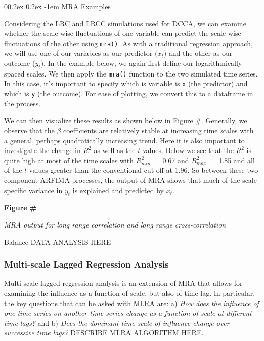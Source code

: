 \documentclass[
  man]{apa6}
\makeatletter
\let\oldparagraph\paragraph
\renewcommand{\paragraph}[1]{\oldparagraph{#1}\mbox{}}
\renewcommand{\paragraph}{\@startsection{paragraph}{4}{\parindent}%
  {0\baselineskip \@plus 0.2ex \@minus 0.2ex}%
  {-1em}%
  {\normalfont\normalsize\bfseries\itshape\typesectitle}}
\makeatother
\begin{document}
\hypertarget{mra-examples}{%
\paragraph{MRA Examples}\label{mra-examples}}

Considering the LRC and LRCC simulations used for DCCA, we can examine
whether the scale-wise fluctuations of one variable can predict the
scale-wise fluctuations of the other using \texttt{mra()}. As with a
traditional regression approach, we will use one of our variables as our
predictor (\(x_t\)) and the other as our outcome (\(y_t\)). In the example
below, we again first define our logarithmically spaced scales. We then
apply the \texttt{mra()} function to the two simulated time series. In this
case, it's important to specify which is variable is \texttt{x} (the predictor)
and which is \texttt{y} (the outcome). For ease of plotting, we convert this to
a dataframe in the process.

We can then visualize these results as shown below in Figure \#.
Generally, we observe that the \(\beta\) coefficients are relatively
stable at increasing time scales with a general, perhaps quadratically
increasing trend. Here it is also important to investigate the change in
\(R^2\) as well as the \(t\)-values. Below we see that the \(R^2\) is quite
high at most of the time scales with \(R^2_{min} =\)
0.67 and \(R^2_{max} =\)
1.85 and all of the \(t\)-values greater than the
conventional cut-off at 1.96. So between these two component ARFIMA
processes, the output of MRA shows that much of the scale specific
variance in \(y_t\) is explained and predicted by \(x_t\).

\textbf{Figure \#}

\emph{MRA output for long range correlation and long range cross-correlation}

Balance DATA ANALYSIS HERE

\hypertarget{multi-scale-lagged-regression-analysis}{%
\subsubsection{Multi-scale Lagged Regression Analysis}\label{multi-scale-lagged-regression-analysis}}

Multi-scale lagged regression analysis is an extension of MRA that
allows for examining the influence as a function of scale, but also of
time lag. In particular, the key questions that can be asked with MLRA
are: a) \emph{How does the influence of one time series on another time
series change as a function of scale at different time lags?} and b)
\emph{Does the dominant time scale of influence change over successive time
lags?} DESCRIBE MLRA ALGORITHM HERE.
\end{document}
